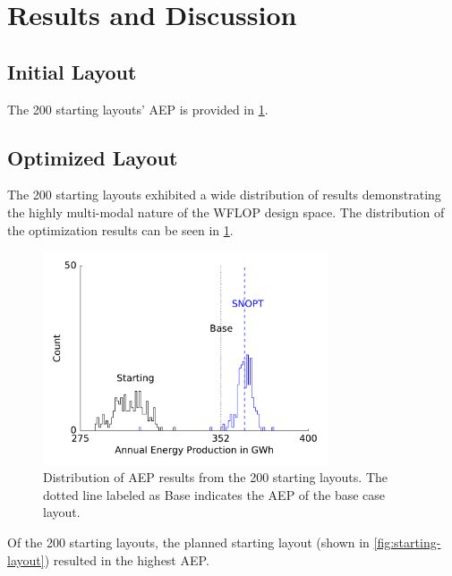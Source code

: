 \documentclass[conf]{new-aiaa}
\begin{document}


\section{Results and Discussion}

\subsection{Initial Layout}
The 200 starting layouts' AEP is provided in \cref{fig:opt-distribution}.

\subsection{Optimized Layout}

The 200 starting layouts exhibited a wide distribution of results demonstrating the highly multi-modal nature of the WFLOP design space. The distribution of the optimization results can be seen in \cref{fig:opt-distribution}.

\begin{figure}[ht]
	\centering
	\includegraphics[width=0.75\textwidth]{final_images/orig_dist.pdf}
	\caption{Distribution of AEP results from the 200 starting layouts. The dotted line labeled as Base indicates the AEP of the base case layout.}
	\label{fig:opt-distribution}
\end{figure}

Of the 200 starting layouts, the planned starting layout (shown in \cref{fig:starting-layout}) resulted in the highest AEP. 

\end{document}
